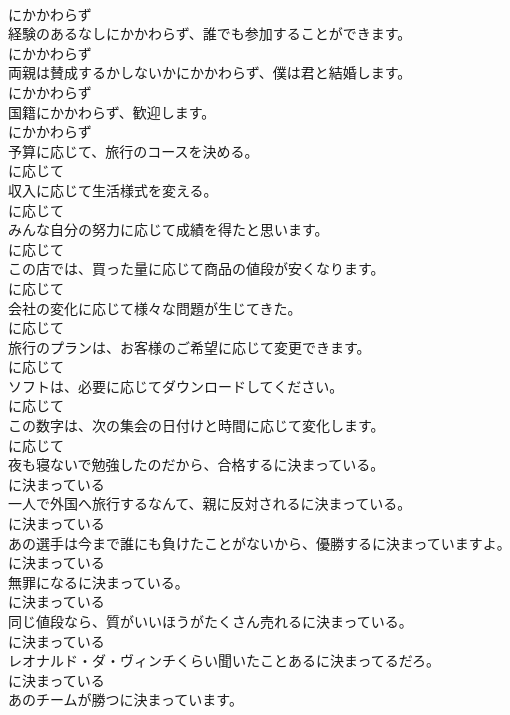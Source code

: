 \documentclass[8pt]{extreport}
\begin{document}
\begin{CJK}{UTF8}{min}
\\	にかかわらず
\\	経験のあるなしにかかわらず、誰でも参加することができます。	
\\	にかかわらず
\\	両親は賛成するかしないかにかかわらず、僕は君と結婚します。	
\\	にかかわらず
\\	国籍にかかわらず、歓迎します。	
\\	にかかわらず
\\	予算に応じて、旅行のコースを決める。	
\\	に応じて
\\	収入に応じて生活様式を変える。	
\\	に応じて
\\	みんな自分の努力に応じて成績を得たと思います。	
\\	に応じて
\\	この店では、買った量に応じて商品の値段が安くなります。	
\\	に応じて
\\	会社の変化に応じて様々な問題が生じてきた。	
\\	に応じて
\\	旅行のプランは、お客様のご希望に応じて変更できます。	
\\	に応じて
\\	ソフトは、必要に応じてダウンロードしてください。	
\\	に応じて
\\	この数字は、次の集会の日付けと時間に応じて変化します。	
\\	に応じて
\\	夜も寝ないで勉強したのだから、合格するに決まっている。	
\\	に決まっている
\\	一人で外国へ旅行するなんて、親に反対されるに決まっている。	
\\	に決まっている
\\	あの選手は今まで誰にも負けたことがないから、優勝するに決まっていますよ。	
\\	に決まっている
\\	無罪になるに決まっている。	
\\	に決まっている
\\	同じ値段なら、質がいいほうがたくさん売れるに決まっている。	
\\	に決まっている
\\	レオナルド・ダ・ヴィンチくらい聞いたことあるに決まってるだろ。	
\\	に決まっている
\\	あのチームが勝つに決まっています。	

\end{CJK}
\end{document}
